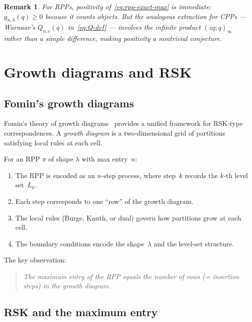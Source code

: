 \documentclass[11pt]{article}
\newtheorem{remark}[theorem]{Remark}
\begin{document}
\begin{remark}
For RPPs, positivity of~\eqref{eq:rpp-exact-max} is
immediate: $g_{n,\lambda}(q) \geq 0$ because it counts
objects. But the analogous extraction for CPPs ---
Warnaar's $Q_{n,c}(q)$ in~\eqref{eq:Q-def} --- involves
the infinite product $(zq;q)_\infty$ rather than a simple
difference, making positivity a nontrivial conjecture.
\end{remark}

\section{Growth diagrams and RSK}
\label{sec:rsk}

\subsection{Fomin's growth diagrams}

Fomin's theory of growth diagrams~\cite{fomin-1986,fomin-1995}
provides a unified framework for RSK-type correspondences.
A \emph{growth diagram} is a two-dimensional grid of
partitions satisfying local rules at each cell.

For an RPP $\pi$ of shape $\lambda$ with max entry~$n$:
\begin{enumerate}
  \item The RPP is encoded as an $n$-step process,
    where step~$k$ records the $k$-th level set~$L_k$.
  \item Each step corresponds to one ``row'' of the growth
    diagram.
  \item The local rules (Burge, Knuth, or dual) govern
    how partitions grow at each cell.
  \item The boundary conditions encode the shape~$\lambda$
    and the level-set structure.
\end{enumerate}

The key observation:
\begin{quote}
\emph{The maximum entry of the RPP equals the number of rows
(= insertion steps) in the growth diagram.}
\end{quote}

\subsection{RSK and the maximum entry}
\end{document}
